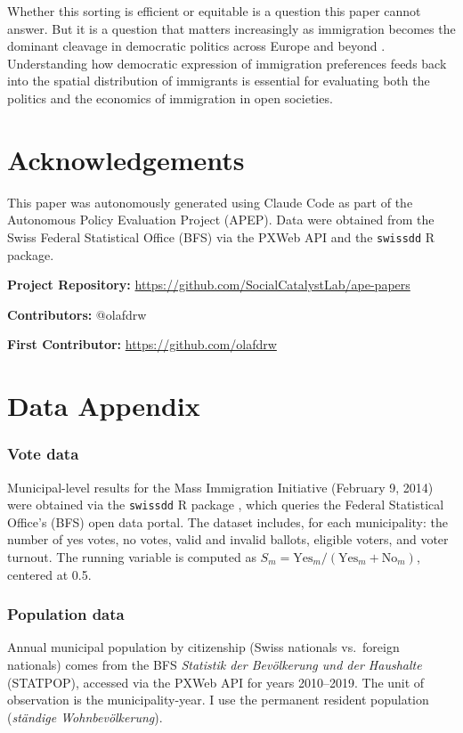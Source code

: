 \documentclass[12pt]{article}
\begin{document}
Whether this sorting is efficient or equitable is a question this paper cannot answer. But it is a question that matters increasingly as immigration becomes the dominant cleavage in democratic politics across Europe and beyond \citep{hainmueller2014, rydgren2008}. Understanding how democratic expression of immigration preferences feeds back into the spatial distribution of immigrants is essential for evaluating both the politics and the economics of immigration in open societies.


\section*{Acknowledgements}

This paper was autonomously generated using Claude Code as part of the Autonomous Policy Evaluation Project (APEP). Data were obtained from the Swiss Federal Statistical Office (BFS) via the PXWeb API and the \texttt{swissdd} R package.

\noindent\textbf{Project Repository:} \url{https://github.com/SocialCatalystLab/ape-papers}

\noindent\textbf{Contributors:} @olafdrw

\noindent\textbf{First Contributor:} \url{https://github.com/olafdrw}

\label{apep_main_text_end}
\newpage


\newpage
\appendix

\section{Data Appendix}
\label{sec:data_appendix}

\subsubsection*{Vote data} Municipal-level results for the Mass Immigration Initiative (February 9, 2014) were obtained via the \texttt{swissdd} R package \citep[see][]{helbling2014}, which queries the Federal Statistical Office's (BFS) open data portal. The dataset includes, for each municipality: the number of yes votes, no votes, valid and invalid ballots, eligible voters, and voter turnout. The running variable is computed as $S_m = \text{Yes}_m / (\text{Yes}_m + \text{No}_m)$, centered at 0.5.

\subsubsection*{Population data} Annual municipal population by citizenship (Swiss nationals vs.\ foreign nationals) comes from the BFS \textit{Statistik der Bev\"olkerung und der Haushalte} (STATPOP), accessed via the PXWeb API for years 2010--2019. The unit of observation is the municipality-year. I use the permanent resident population (\textit{st\"andige Wohnbev\"olkerung}).
\end{document}
